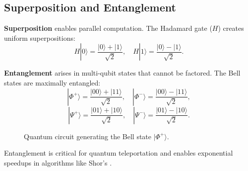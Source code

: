 \subsection{Superposition and Entanglement}
\label{subsec:superposition}

\textbf{Superposition} enables parallel computation. The Hadamard gate ($H$) creates uniform superpositions:
\[
H|0\rangle = \frac{|0\rangle + |1\rangle}{\sqrt{2}}, \quad H|1\rangle = \frac{|0\rangle - |1\rangle}{\sqrt{2}}.
\]

\textbf{Entanglement} arises in multi-qubit states that cannot be factored. The Bell states are maximally entangled:
\[
|\Phi^+\rangle = \frac{|00\rangle + |11\rangle}{\sqrt{2}}, \quad |\Phi^-\rangle = \frac{|00\rangle - |11\rangle}{\sqrt{2}},
\]
\[
|\Psi^+\rangle = \frac{|01\rangle + |10\rangle}{\sqrt{2}}, \quad |\Psi^-\rangle = \frac{|01\rangle - |10\rangle}{\sqrt{2}}.
\]

\begin{figure}[h]
\centering
{}
\caption{Quantum circuit generating the Bell state $|\Phi^+\rangle$.}
\label{fig:bell_circuit}
\end{figure}

Entanglement is critical for quantum teleportation \cite{bennett1993teleporting} and enables exponential speedups in algorithms like Shor's \cite{shor1999polynomial}.